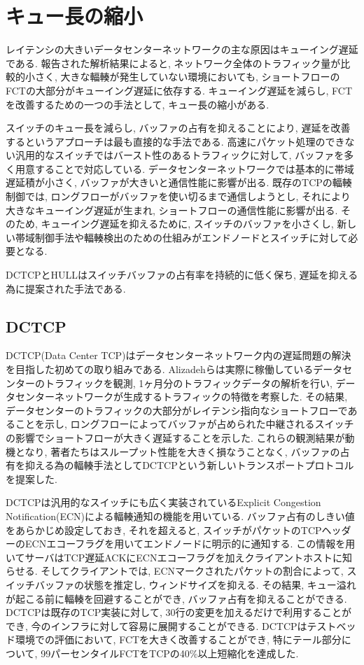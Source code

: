 \section{キュー長の縮小}
レイテンシの大きいデータセンターネットワークの主な原因はキューイング遅延である\cite{dctcp}. 
報告された解析結果\cite{dctcp}によると, ネットワーク全体のトラフィック量が比較的小さく, 大きな輻輳が発生していない環境においても,
ショートフローのFCTの大部分がキューイング遅延に依存する. 
キューイング遅延を減らし, FCTを改善するための一つの手法として, キュー長の縮小がある. 

スイッチのキュー長を減らし, バッファの占有を抑えることにより, 遅延を改善するというアプローチは最も直接的な手法である. 
高速にパケット処理のできない汎用的なスイッチではバースト性のあるトラフィックに対して, バッファを多く用意することで対応している. 
データセンターネットワークでは基本的に帯域遅延積が小さく, バッファが大きいと通信性能に影響が出る. 
既存のTCPの輻輳制御では, ロングフローがバッファを使い切るまで通信しようとし, それにより大きなキューイング遅延が生まれ,
ショートフローの通信性能に影響が出る. 
そのため, キューイング遅延を抑えるために, スイッチのバッファを小さくし,
新しい帯域制御手法や輻輳検出のための仕組みがエンドノードとスイッチに対して必要となる. 

DCTCP\cite{dctcp}とHULL\cite{hull}はスイッチバッファの占有率を持続的に低く保ち, 遅延を抑える為に提案された手法である. 

\subsection{DCTCP}
DCTCP(Data Center TCP)\cite{dctcp}はデータセンターネットワーク内の遅延問題の解決を目指した初めての取り組みである. 
Alizadehら\cite{dctcp}は実際に稼働しているデータセンターのトラフィックを観測, 1ヶ月分のトラフィックデータの解析を行い,
データセンターネットワークが生成するトラフィックの特徴を考察した. 
その結果, データセンターのトラフィックの大部分がレイテンシ指向なショートフローであることを示し,
ロングフローによってバッファが占められた中継されるスイッチの影響でショートフローが大きく遅延することを示した. 
これらの観測結果が動機となり, 著者たちはスループット性能を大きく損なうことなく,
バッファの占有を抑える為の輻輳手法としてDCTCPという新しいトランスポートプロトコルを提案した. 

DCTCPは汎用的なスイッチにも広く実装されているExplicit Congestion
Notification(ECN)による輻輳通知の機能を用いている.
バッファ占有のしきい値をあらかじめ設定しておき, それを超えると,
スイッチがパケットのTCPヘッダーのECNエコーフラグを用いてエンドノードに明示的に通知する.
この情報を用いてサーバはTCP遅延ACKにECNエコーフラグを加えクライアントホストに知らせる. 
そしてクライアントでは, ECNマークされたパケットの割合によって, スイッチバッファの状態を推定し, ウィンドサイズを抑える. 
その結果, キュー溢れが起こる前に輻輳を回避することができ, バッファ占有を抑えることができる. 
DCTCPは既存のTCP実装に対して, 30行の変更を加えるだけで利用することができ, 今のインフラに対して容易に展開することができる. 
DCTCPはテストベッド環境での評価において, FCTを大きく改善することができ, 特にテール部分について,
99パーセンタイルFCTをTCPの40\%以上短縮化を達成した. 


